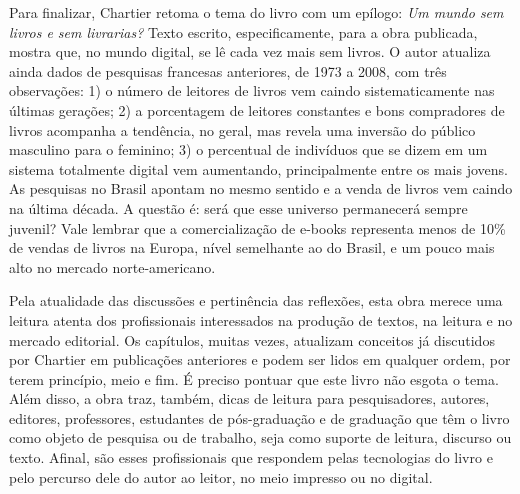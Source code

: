 \documentclass[portuguese]{textolivre}
\begin{document}
Para finalizar, Chartier retoma o tema do livro com um epílogo: \emph{Um mundo sem livros e sem livrarias?} Texto escrito, especificamente, para a obra publicada, mostra que, no mundo digital, se lê cada vez mais sem livros. O autor atualiza ainda dados de pesquisas francesas anteriores, de 1973 a 2008, com três observações: 1) o número de leitores de livros vem caindo sistematicamente nas últimas gerações; 2) a porcentagem de leitores constantes e bons compradores de livros acompanha a tendência, no geral, mas revela uma inversão do público masculino para o feminino; 3) o percentual de indivíduos que se dizem em um sistema totalmente digital vem aumentando, principalmente entre os mais jovens. As pesquisas no Brasil apontam no mesmo sentido e a venda de livros vem caindo na última década. A questão é: será que esse universo permanecerá sempre juvenil? Vale lembrar que a comercialização de e-books representa menos de 10\% de vendas de livros na Europa, nível semelhante ao do Brasil, e um pouco mais alto no mercado norte-americano.

Pela atualidade das discussões e pertinência das reflexões, esta obra merece uma leitura atenta dos profissionais interessados na produção de textos, na leitura e no mercado editorial. Os capítulos, muitas vezes, atualizam conceitos já discutidos por Chartier em publicações anteriores e podem ser lidos em qualquer ordem, por terem princípio, meio e fim. É preciso pontuar que este livro não esgota o tema. Além disso, a obra traz, também, dicas de leitura para pesquisadores, autores, editores, professores, estudantes de pós-graduação e de graduação que têm o livro como objeto de pesquisa ou de trabalho, seja como suporte de leitura, discurso ou texto. Afinal, são esses profissionais que respondem pelas tecnologias do livro e pelo percurso dele do autor ao leitor, no meio impresso ou no digital.

\printbibliography\label{sec-bib}
\end{document}
